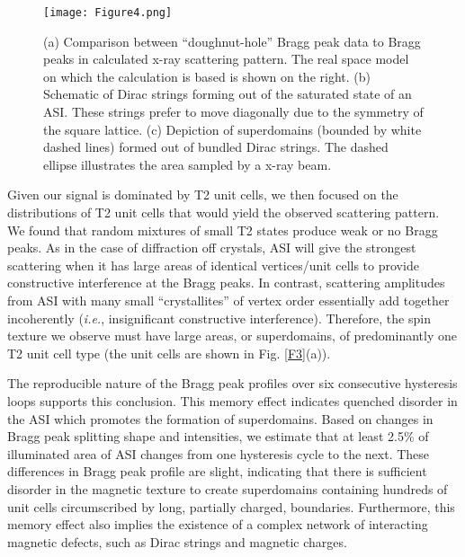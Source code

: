 \documentclass[aps, prb, reprint, showpacs, superscriptaddress]{revtex4-1}
\begin{document}
\begin{figure}
\texttt{[image: Figure4.png]}
\caption{ 
(a) Comparison between ``doughnut-hole'' Bragg peak data to Bragg peaks in calculated x-ray scattering pattern. The real space model on which the calculation is based is shown on the right.
(b) Schematic of Dirac strings forming out of the saturated state of an ASI. These strings prefer to move diagonally due to the symmetry of the square lattice.  
(c) Depiction of superdomains (bounded by white dashed lines) formed out of bundled Dirac strings. The dashed ellipse illustrates the area sampled by a x-ray beam. 
}
\label{F4}
\end{figure}

Given our signal is dominated by T2 unit cells, we then focused on the distributions of T2 unit cells that would yield the observed scattering pattern.
We found that random mixtures of small T2 states produce weak or no Bragg peaks.
As in the case of diffraction off crystals, ASI will give the strongest scattering when it has large areas of identical vertices/unit cells to provide constructive interference at the Bragg peaks.
In contrast, scattering amplitudes from ASI with many small ``crystallites'' of vertex order essentially add together incoherently (\textit{i.e.}, insignificant constructive interference). 
Therefore, the spin texture we observe must have large areas, or superdomains, of predominantly one T2 unit cell type (the unit cells are shown in Fig. \ref{F3}(a)).

The reproducible nature of the Bragg peak profiles over six consecutive hysteresis loops supports this conclusion.
This memory effect indicates quenched disorder in the ASI which promotes the formation of superdomains.
Based on changes in Bragg peak splitting shape and intensities, we estimate that at least 2.5\% of illuminated area of ASI changes from one hysteresis cycle to the next.
These differences in Bragg peak profile are slight, indicating that there is sufficient disorder in the magnetic texture to create superdomains containing hundreds of unit cells circumscribed by long, partially charged, boundaries.\cite{Reichardt}
Furthermore, this memory effect also implies the existence of a complex network of interacting magnetic defects, such as Dirac strings and magnetic charges.\cite{GilbertPRB}
\end{document}
